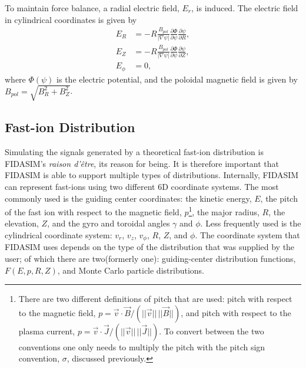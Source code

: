 To maintain force balance, a radial electric field, $E_r$, is induced. The electric field in cylindrical coordinates is given by
\begin{equation}\label{eq:efield}
\begin{split}
    E_R &= -R \frac{B_{pol}}{|\nabla \psi|} \frac{\partial \Phi}{\partial \psi} \frac{\partial \psi}{\partial R},\\
    E_Z &= -R \frac{B_{pol}}{|\nabla \psi|} \frac{\partial \Phi}{\partial \psi} \frac{\partial \psi}{\partial Z},\\
    E_{\phi} &= 0,
\end{split}
\end{equation}
where $\Phi(\psi)$ is the electric potential, and the poloidal magnetic field is given by $B_{pol} = \sqrt{B_R^2 + B_Z^2}$.


\subsection{Fast-ion Distribution}
Simulating the signals generated by a theoretical fast-ion distribution is FIDASIM's \textit{raison d'\^etre}, its reason for being. It is therefore important that FIDASIM is able to support multiple types of distributions.
Internally, FIDASIM can represent fast-ions using two different 6D coordinate systems. The most commonly used is the guiding center coordinates: the kinetic energy, $E$, the pitch of the fast ion with respect to the magnetic field, $p$\footnote{There are two different definitions of pitch that are used: pitch with respect to the magnetic field, $p = \vec{v}\cdot\vec{B}/(||\vec{v}||\,||\vec{B}||)$, and pitch with respect to the plasma current, $p = \vec{v}\cdot\vec{J}/(||\vec{v}||\,||\vec{J}||)$. To convert between the two conventions one only needs to multiply the pitch with the pitch sign convention, $\sigma$, discussed previously.}, the major radius, $R$, the elevation, $Z$, and the gyro and toroidal angles $\gamma$ and $\phi$. Less frequently used is the cylindrical coordinate system: $v_r$, $v_z$, $v_\phi$, $R$, $Z$, and $\phi$.
The coordinate system that FIDASIM uses depends on the type of the distribution that was supplied by the user; of which there are two(formerly one): guiding-center distribution functions, $F(E,p,R,Z)$, and Monte Carlo particle distributions.

